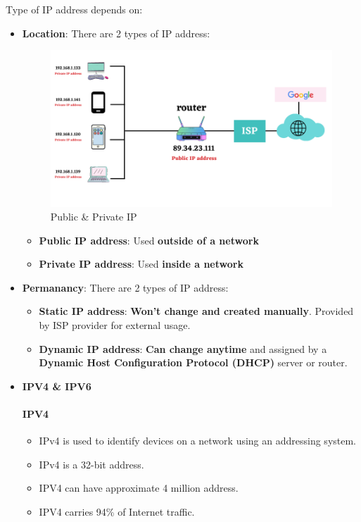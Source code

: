 \setlength{\columnsep}{3pt}
\begin{flushleft}

Type of IP address depends on:
\begin{itemize}
	\item \textbf{Location}: There are 2 types of IP address:
	\begin{figure}[h!]
		\centering
		\includegraphics[scale=0.4]{content/chapter14/images/public_private.png}
		\caption{Public \& Private IP}
		\label{fig:public_private_ip}
	\end{figure}
	
	\begin{itemize}
		\item \textbf{Public IP address}: Used \textbf{outside of a network}
		\item \textbf{Private IP address}: Used \textbf{inside a network}
	\end{itemize}
	\bigskip
	\bigskip
	\item \textbf{Permanancy}: There are 2 types of IP address:
	\begin{itemize}
		\item \textbf{Static IP address}: \textbf{Won't change and created manually}. Provided by ISP provider for external usage. 
		\item \textbf{Dynamic IP address}: \textbf{Can change anytime} and assigned by a \textbf{Dynamic Host Configuration Protocol (DHCP)} server or router.
	\end{itemize}
	\bigskip
	\bigskip
	\item \textbf{IPV4 \& IPV6}
	\paragraph{IPV4}
	\begin{itemize}
		\item IPv4 is used to identify devices on a network using an addressing system.
		\item IPv4 is a 32-bit address.
		\item IPV4 can have approximate 4 million address.
		\item IPV4 carries 94\% of Internet traffic.
	\end{itemize}

\end{itemize}
\end{flushleft}
